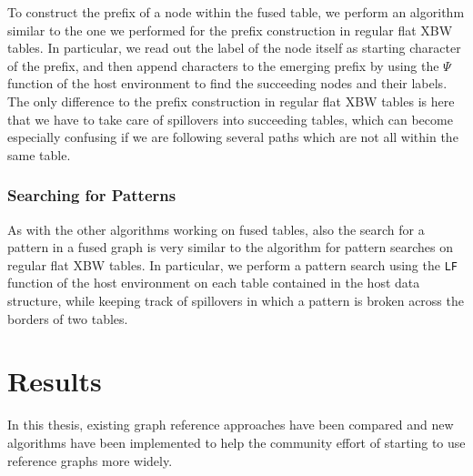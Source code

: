 \documentclass[a4paper,12pt,twoside,BCOR=10mm]{scrbook}
\begin{document}
To construct the prefix of a node within the fused table,
we perform an algorithm similar to the one we performed for the prefix construction
in regular flat XBW tables.
In particular, we read out the label of the node itself as starting character of the prefix,
and then append characters to the emerging prefix by using the $\Psi$ function of the host environment to
find the succeeding nodes and their labels.
The only difference to the prefix construction in regular flat XBW tables
is here that we have to take care of spillovers into succeeding tables,
which can become especially confusing if we are following several paths which are not all
within the same table.


\subsection{Searching for Patterns}

As with the other algorithms working on fused tables, also the search for a pattern
in a fused graph is very similar to the algorithm for pattern searches on regular flat XBW tables.
In particular, we perform a pattern search using the \texttt{LF} function of the host environment on each table contained
in the host data structure, while keeping track of spillovers in which a pattern is broken
across the borders of two tables.


\chapter{Results}
%

In this thesis, existing graph reference approaches have been compared
and new algorithms have been implemented to help the community effort
of starting to use reference graphs more widely.
\end{document}
